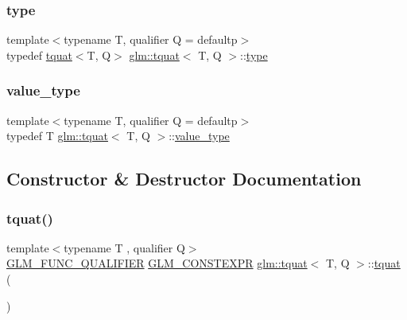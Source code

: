 \mbox{\label{structglm_1_1tquat_ae9600f57e83d084305f1c801150fbd36}} 
\subsubsection{\texorpdfstring{type}{type}}
{\footnotesize\ttfamily template$<$typename T, qualifier Q = defaultp$>$ \\
typedef \hyperlink{structglm_1_1tquat}{tquat}$<$T, Q$>$ \hyperlink{structglm_1_1tquat}{glm\+::tquat}$<$ T, Q $>$\+::\hyperlink{structglm_1_1tquat_ae9600f57e83d084305f1c801150fbd36}{type}}

\mbox{\label{structglm_1_1tquat_ac02efd34879e12e77f5143df3708b070}} 
\subsubsection{\texorpdfstring{value\+\_\+type}{value\_type}}
{\footnotesize\ttfamily template$<$typename T, qualifier Q = defaultp$>$ \\
typedef T \hyperlink{structglm_1_1tquat}{glm\+::tquat}$<$ T, Q $>$\+::\hyperlink{structglm_1_1tquat_ac02efd34879e12e77f5143df3708b070}{value\+\_\+type}}



\subsection{Constructor \& Destructor Documentation}
\mbox{\label{structglm_1_1tquat_a5ddc2ac5c094aa455d5dc896a1acf686}} 
\subsubsection{\texorpdfstring{tquat()}{tquat()}\hspace{0.1cm}{\footnotesize\ttfamily [1/12]}}
{\footnotesize\ttfamily template$<$typename T , qualifier Q$>$ \\
\hyperlink{setup_8hpp_a33fdea6f91c5f834105f7415e2a64407}{G\+L\+M\+\_\+\+F\+U\+N\+C\+\_\+\+Q\+U\+A\+L\+I\+F\+I\+ER} \hyperlink{setup_8hpp_a08b807947b47031d3a511f03f89645ad}{G\+L\+M\+\_\+\+C\+O\+N\+S\+T\+E\+X\+PR} \hyperlink{structglm_1_1tquat}{glm\+::tquat}$<$ T, Q $>$\+::\hyperlink{structglm_1_1tquat}{tquat} (\begin{DoxyParamCaption}{ }\end{DoxyParamCaption})}

